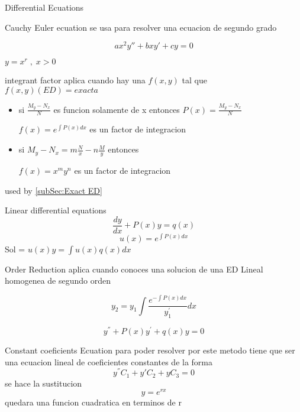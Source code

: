 \begin{section}{Differential Ecuations}
	\begin{subsection}{Cauchy Euler ecuation}
		se usa para resolver una ecuacion de segundo grado
	
	
		$$ax^2y'' + bxy' + cy = 0$$
		\begin{center}
		$y = x^r \;, \; x > 0 $
		\end{center}
	\end{subsection}
	
	\begin{subsection}{integrant factor}
	aplica cuando hay una $f(x,y) $ tal que $f(x,y)(ED) = exacta$
	
	\begin{itemize}
		\item si $ \frac{M_y - N_x}{N}$ es funcion solamente de x entonces $P(x) = \frac{M_y - N_x}{N}$
			\begin{center}
		$f(x) = e^{\int P(x)dx}$ es un factor de integracion
			\end{center}
	
		\item si $M_y - N_x = m\frac{N}{x} - n\frac{M}{y}$ entonces
			\begin{center}
				$f(x) = x^my^n$ es un factor de integracion
			\end{center}
	
	\end{itemize}
		\label{subSec:integrant factor}
		used by \autoref{subSec:Exact ED}{}
	
	\end{subsection}
	\begin{subsection}{Linear differential equations}
		$$\frac{dy}{dx} + P(x)y = q(x) $$
		$$u(x) = e^{\int P(x) dx }$$
		Sol =  $u(x)y = \int u(x)q(x)dx$
	
	\end{subsection}
	\begin{subsection}{Order Reduction}
		aplica cuando conoces una solucion de una ED Lineal homogenea de segundo orden
		
		$$y_2 = y_1 \int \frac{e^{- \int P(x) dx }}{y_1^{'}} dx $$
		
		$$y^{''} + P(x)y^{'} + q(x)y = 0$$
	\end{subsection}
	\newpage
	\begin{subsection}{Constant coeficients Ecuation}
		para poder resolver por este metodo tiene que ser una ecuacion lineal de coeficientes constantes
		de la forma $$y^{''}C_1 + y{'}C_2 + yC_3 = 0$$
		se hace la sustitucion $$y=e^{rx}$$ quedara una funcion cuadratica en terminos de r
		

\end{subsection}
\end{section}
